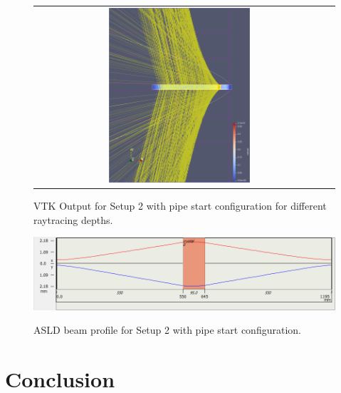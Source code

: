 \documentclass[a4paper,10pt]{article}
\begin{document}
\begin{figure}
\begin{tabular}{c c}
            \includegraphics[width=0.5\textwidth]{images/open_pipe/4.png} \\
        \end{tabular}
        \label{fig:setup2_pipe_depths}
        \caption[VTK Output for Setup 2 with pipe start configuration
        different raytracing depths]{
            VTK Output for Setup 2 with pipe start configuration for different 
            raytracing depths.
            }
    \end{figure}

    \begin{figure}
        \includegraphics[width=1.0\textwidth]{images/open_pipe/beam.png} \\
        \label{fig:setup2_pipe_beam}
        \caption[ASLD beam profile for Setup 2 with pipe start configuration]{
            ASLD beam profile for Setup 2 with pipe start configuration.
        }
    \end{figure}


    \clearpage
    \section{Conclusion}
\end{document}
